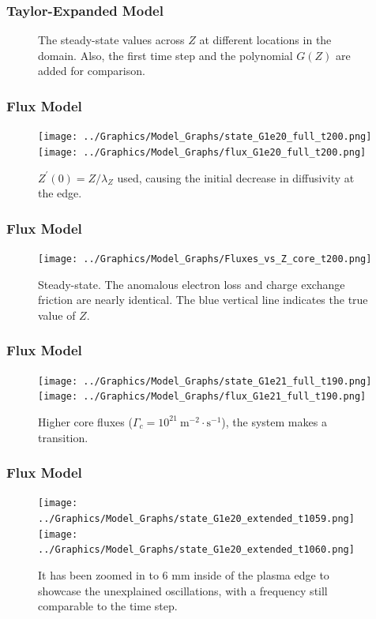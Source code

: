 \documentclass[10pt]{beamer}
\newcommand\TwoFigOneCap[4]{%
	\begin{figure}[hbt]
		\minipage[t]{0.48\textwidth}\centering
			{#1}
		\endminipage\hfill
		\minipage[t]{0.48\textwidth}\centering
			{#2}
		\endminipage
		\caption{#3}\label{#4}
	\end{figure}%
}
\begin{document}
\begin{frame} %
\frametitle{Taylor-Expanded Model}
\begin{figure}[h]
	\caption{The steady-state values across $Z$ at different locations in the domain.
	Also, the first time step and the polynomial $G(Z)$ are added for comparison.}
\end{figure}
\end{frame}


\begin{frame} %
\frametitle{Flux Model}
\TwoFigOneCap{\texttt{[image: ../Graphics/Model\_Graphs/state\_G1e20\_full\_t200.png]}}
	{\texttt{[image: ../Graphics/Model\_Graphs/flux\_G1e20\_full\_t200.png]}}
	{$Z^\prime(0) = Z / \lambda_Z$ used, causing the initial decrease in diffusivity at the edge.}
	{fig:flux_state_full}
\end{frame}


\begin{frame} %
\frametitle{Flux Model}
\begin{figure}[!b] %
	\centering
	\texttt{[image: ../Graphics/Model\_Graphs/Fluxes\_vs\_Z\_core\_t200.png]}
	\caption{Steady-state. The anomalous electron loss and charge exchange friction are nearly identical.
	The blue vertical line indicates the true value of $Z$.}
	\label{fig:fluxes_steady-state}
\end{figure}
\end{frame}


\begin{frame} %
\frametitle{Flux Model}
\TwoFigOneCap{\texttt{[image: ../Graphics/Model\_Graphs/state\_G1e21\_full\_t190.png]}}
	{\texttt{[image: ../Graphics/Model\_Graphs/flux\_G1e21\_full\_t190.png]}}
	{Higher core fluxes ($\Gamma_c = 10^{21}~\text{m}^{-2}\cdot\text{s}^{-1}$), the system makes a transition.}
	{fig:higher_core_flux}
\end{frame}


\begin{frame} %
\frametitle{Flux Model}

\TwoFigOneCap{\texttt{[image: ../Graphics/Model\_Graphs/state\_G1e20\_extended\_t1059.png]}}
	{\texttt{[image: ../Graphics/Model\_Graphs/state\_G1e20\_extended\_t1060.png]}}
	{It has been zoomed in to 6 mm inside of the plasma edge to showcase the unexplained oscillations, with a frequency still comparable to the time step.}
	{fig:oscillations_extended}

\end{frame}
\end{document}
